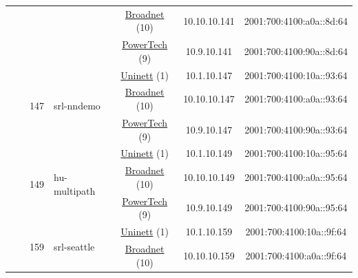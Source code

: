 \begin{small}
\begin{center}
\begin{longtable}{|c|c|c|c|c|c|c|c|}
  &  &  &  & \multicolumn{2}{|c|}{\tiny{\href{https://www.broadnet.no}{Broadnet} (10)}} & \tiny{10.10.10.141} & \tiny{2001:700:4100:a0a::8d:64} \\* \cline{5-5}\cline{6-6}\cline{7-7}\cline{8-8}
  &  &  &  & \multicolumn{2}{|c|}{\tiny{\href{http://www.powertech.no}{PowerTech} (9)}} & \tiny{10.9.10.141} & \tiny{2001:700:4100:90a::8d:64} \\* \cline{3-3}\cline{4-4}\cline{5-5}\cline{6-6}\cline{7-7}\cline{8-8}
  &  & \multirow{3}{*}{\tiny{147}} & \multicolumn{1}{|l|}{\multirow{3}{*}{\tiny{srl-nndemo}}} & \multicolumn{2}{|c|}{\tiny{\href{https://www.uninett.no}{Uninett} (1)}} & \tiny{10.1.10.147} & \tiny{2001:700:4100:10a::93:64} \\* \cline{5-5}\cline{6-6}\cline{7-7}\cline{8-8}
  &  &  &  & \multicolumn{2}{|c|}{\tiny{\href{https://www.broadnet.no}{Broadnet} (10)}} & \tiny{10.10.10.147} & \tiny{2001:700:4100:a0a::93:64} \\* \cline{5-5}\cline{6-6}\cline{7-7}\cline{8-8}
  &  &  &  & \multicolumn{2}{|c|}{\tiny{\href{http://www.powertech.no}{PowerTech} (9)}} & \tiny{10.9.10.147} & \tiny{2001:700:4100:90a::93:64} \\* \cline{3-3}\cline{4-4}\cline{5-5}\cline{6-6}\cline{7-7}\cline{8-8}
  &  & \multirow{3}{*}{\tiny{149}} & \multicolumn{1}{|l|}{\multirow{3}{*}{\tiny{hu-multipath}}} & \multicolumn{2}{|c|}{\tiny{\href{https://www.uninett.no}{Uninett} (1)}} & \tiny{10.1.10.149} & \tiny{2001:700:4100:10a::95:64} \\* \cline{5-5}\cline{6-6}\cline{7-7}\cline{8-8}
  &  &  &  & \multicolumn{2}{|c|}{\tiny{\href{https://www.broadnet.no}{Broadnet} (10)}} & \tiny{10.10.10.149} & \tiny{2001:700:4100:a0a::95:64} \\* \cline{5-5}\cline{6-6}\cline{7-7}\cline{8-8}
  &  &  &  & \multicolumn{2}{|c|}{\tiny{\href{http://www.powertech.no}{PowerTech} (9)}} & \tiny{10.9.10.149} & \tiny{2001:700:4100:90a::95:64} \\* \cline{3-3}\cline{4-4}\cline{5-5}\cline{6-6}\cline{7-7}\cline{8-8}
  &  & \multirow{3}{*}{\tiny{159}} & \multicolumn{1}{|l|}{\multirow{3}{*}{\tiny{srl-seattle}}} & \multicolumn{2}{|c|}{\tiny{\href{https://www.uninett.no}{Uninett} (1)}} & \tiny{10.1.10.159} & \tiny{2001:700:4100:10a::9f:64} \\* \cline{5-5}\cline{6-6}\cline{7-7}\cline{8-8}
  &  &  &  & \multicolumn{2}{|c|}{\tiny{\href{https://www.broadnet.no}{Broadnet} (10)}} & \tiny{10.10.10.159} & \tiny{2001:700:4100:a0a::9f:64} \\* \cline{5-5}\cline{6-6}\cline{7-7}\cline{8-8}

\end{longtable}
\end{center}
\end{small}
